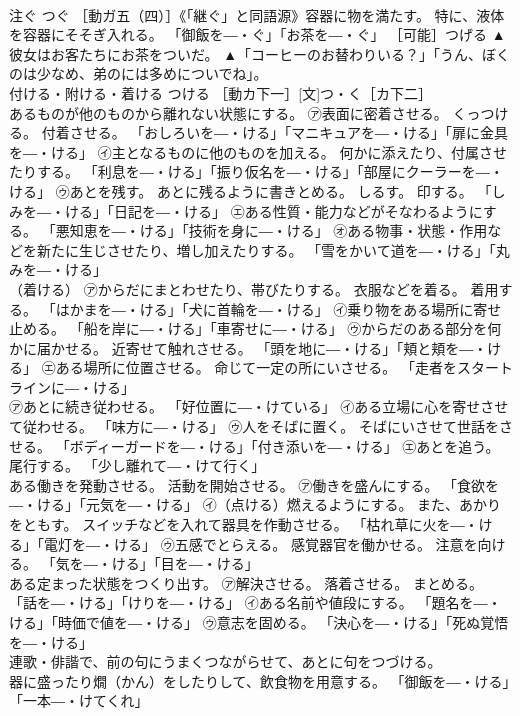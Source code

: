 \documentclass[8pt]{extreport}
\begin{document}
\begin{CJK}{UTF8}{min}
\\	注ぐ	つぐ	［動ガ五（四）］《「継ぐ」と同語源》容器に物を満たす。 特に、液体を容器にそそぎ入れる。 「御飯を―・ぐ」「お茶を―・ぐ」 ［可能］つげる	▲彼女はお客たちにお茶をついだ。 ▲「コーヒーのお替わりいる？」「うん、ぼくのは少なめ、弟のには多めについでね」。
\\	付ける・附ける・着ける	つける	［動カ下一］[文]つ・く［カ下二］ 
\\	あるものが他のものから離れない状態にする。 ㋐表面に密着させる。 くっつける。 付着させる。 「おしろいを―・ける」「マニキュアを―・ける」「扉に金具を―・ける」 ㋑主となるものに他のものを加える。 何かに添えたり、付属させたりする。 「利息を―・ける」「振り仮名を―・ける」「部屋にクーラーを―・ける」 ㋒あとを残す。 あとに残るように書きとめる。 しるす。 印する。 「しみを―・ける」「日記を―・ける」 ㋓ある性質・能力などがそなわるようにする。 「悪知恵を―・ける」「技術を身に―・ける」 ㋔ある物事・状態・作用などを新たに生じさせたり、増し加えたりする。 「雪をかいて道を―・ける」「丸みを―・ける」 
\\	（着ける） ㋐からだにまとわせたり、帯びたりする。 衣服などを着る。 着用する。 「はかまを―・ける」「犬に首輪を―・ける」 ㋑乗り物をある場所に寄せ止める。 「船を岸に―・ける」「車寄せに―・ける」 ㋒からだのある部分を何かに届かせる。 近寄せて触れさせる。 「頭を地に―・ける」「頬と頬を―・ける」 ㋓ある場所に位置させる。 命じて一定の所にいさせる。 「走者をスタートラインに―・ける」 
\\	㋐あとに続き従わせる。 「好位置に―・けている」 ㋑ある立場に心を寄せさせて従わせる。 「味方に―・ける」 ㋒人をそばに置く。 そばにいさせて世話をさせる。 「ボディーガードを―・ける」「付き添いを―・ける」 ㋓あとを追う。 尾行する。 「少し離れて―・けて行く」 
\\	ある働きを発動させる。 活動を開始させる。 ㋐働きを盛んにする。 「食欲を―・ける」「元気を―・ける」 ㋑（点ける）燃えるようにする。 また、あかりをともす。 スイッチなどを入れて器具を作動させる。 「枯れ草に火を―・ける」「電灯を―・ける」 ㋒五感でとらえる。 感覚器官を働かせる。 注意を向ける。 「気を―・ける」「目を―・ける」 
\\	ある定まった状態をつくり出す。 ㋐解決させる。 落着させる。 まとめる。 「話を―・ける」「けりを―・ける」 ㋑ある名前や値段にする。 「題名を―・ける」「時価で値を―・ける」 ㋒意志を固める。 「決心を―・ける」「死ぬ覚悟を―・ける」 
\\	連歌・俳諧で、前の句にうまくつながらせて、あとに句をつづける。 
\\	器に盛ったり燗（かん）をしたりして、飲食物を用意する。 「御飯を―・ける」「一本―・けてくれ」 

\end{CJK}
\end{document}
